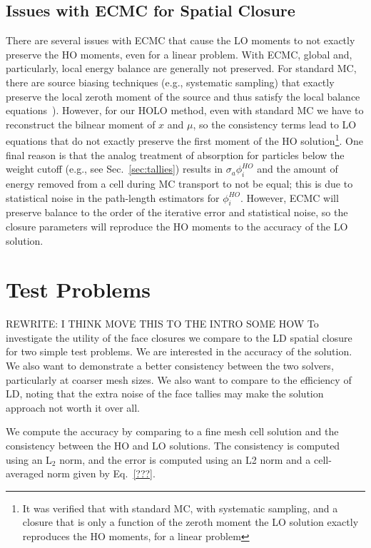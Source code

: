 \subsection{Issues with ECMC for Spatial Closure}

There are several issues with ECMC that cause the LO moments to not exactly preserve
the HO moments, even for a linear problem.  With ECMC, global and, particularly, local
energy balance are generally not preserved.  For standard MC, there
are source biasing techniques (e.g., systematic
sampling) that exactly preserve the local zeroth moment of the
source and thus satisfy the local balance equations~\cite{shultis_mc,wollaber_review}). 
However, for our HOLO method, even with standard MC we have to reconstruct the bilnear moment
of $x$ and $\mu$, so the consistency terms lead to LO equations that do not exactly
preserve the first moment of the HO solution\footnote{It was verified that with standard
    MC, with systematic sampling, and a closure that is only a function of the zeroth moment the LO solution exactly
reproduces the HO moments, for a linear problem}.  One final reason is that the analog treatment of absorption for particles below
the weight cutoff (e.g., see Sec.~\ref{sec:tallies}) results in $\sigma_a \phi^{HO}_i$ and the amount
of energy removed from a cell during MC transport to not be equal; this is due to statistical noise in the
path-length estimators for $\phi^{HO}_i$.  However, ECMC will preserve
balance to the order of the iterative error and statistical noise, so the closure parameters will
reproduce the HO moments to the accuracy of the LO solution.  

\section{Test Problems}

REWRITE: I THINK MOVE THIS TO THE INTRO SOME HOW
To investigate the utility of the face closures we compare to the LD spatial
closure for two simple test problems.  We are interested in the accuracy of the solution. 
We also want to demonstrate a better consistency between the two solvers, particularly at
coarser mesh sizes.  We also want to compare to the efficiency of LD, noting that the
extra noise of the face tallies may make the solution approach not worth it over all.

We compute the accuracy by comparing to a fine mesh cell solution and the consistency between the HO and LO solutions.
The consistency is computed using an L$_2$ norm, and the error is computed using an L2 norm and a cell-averaged norm
given by Eq.~\eqref{???}.

